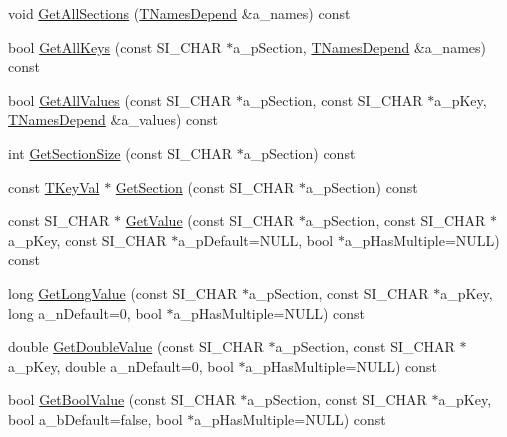 \begin{DoxyCompactItemize}
void \hyperlink{classCSimpleIniTempl_a65b01b5bf88d0dfe3ba51f12278cbcb8}{Get\+All\+Sections} (\hyperlink{classCSimpleIniTempl_a391b3f3751e06cd9e9de4fb16ac14342}{T\+Names\+Depend} \&a\+\_\+names) const 
\item 
bool \hyperlink{classCSimpleIniTempl_a8cf1357d78d28653b68790ab5d5b45f1}{Get\+All\+Keys} (const S\+I\+\_\+\+C\+H\+AR $\ast$a\+\_\+p\+Section, \hyperlink{classCSimpleIniTempl_a391b3f3751e06cd9e9de4fb16ac14342}{T\+Names\+Depend} \&a\+\_\+names) const 
\item 
bool \hyperlink{classCSimpleIniTempl_a263c85a8cd839c315fefc078e048257b}{Get\+All\+Values} (const S\+I\+\_\+\+C\+H\+AR $\ast$a\+\_\+p\+Section, const S\+I\+\_\+\+C\+H\+AR $\ast$a\+\_\+p\+Key, \hyperlink{classCSimpleIniTempl_a391b3f3751e06cd9e9de4fb16ac14342}{T\+Names\+Depend} \&a\+\_\+values) const 
\item 
int \hyperlink{classCSimpleIniTempl_a2e612d67d1e1631c157af6291ac8c348}{Get\+Section\+Size} (const S\+I\+\_\+\+C\+H\+AR $\ast$a\+\_\+p\+Section) const 
\item 
const \hyperlink{classCSimpleIniTempl_ae7f0e11d84617214bd479de6332c80e6}{T\+Key\+Val} $\ast$ \hyperlink{classCSimpleIniTempl_a795e2fcbad3472055aedfe188f4f8d33}{Get\+Section} (const S\+I\+\_\+\+C\+H\+AR $\ast$a\+\_\+p\+Section) const 
\item 
const S\+I\+\_\+\+C\+H\+AR $\ast$ \hyperlink{classCSimpleIniTempl_a39999339113e9395d5e2c6b02ef5c618}{Get\+Value} (const S\+I\+\_\+\+C\+H\+AR $\ast$a\+\_\+p\+Section, const S\+I\+\_\+\+C\+H\+AR $\ast$a\+\_\+p\+Key, const S\+I\+\_\+\+C\+H\+AR $\ast$a\+\_\+p\+Default=N\+U\+LL, bool $\ast$a\+\_\+p\+Has\+Multiple=N\+U\+LL) const 
\item 
long \hyperlink{classCSimpleIniTempl_a994c6b29bb8b4c16a4b1a7f4c8b2b3f4}{Get\+Long\+Value} (const S\+I\+\_\+\+C\+H\+AR $\ast$a\+\_\+p\+Section, const S\+I\+\_\+\+C\+H\+AR $\ast$a\+\_\+p\+Key, long a\+\_\+n\+Default=0, bool $\ast$a\+\_\+p\+Has\+Multiple=N\+U\+LL) const 
\item 
double \hyperlink{classCSimpleIniTempl_a6ce7c77a1d5d64dc289927a5c2659e78}{Get\+Double\+Value} (const S\+I\+\_\+\+C\+H\+AR $\ast$a\+\_\+p\+Section, const S\+I\+\_\+\+C\+H\+AR $\ast$a\+\_\+p\+Key, double a\+\_\+n\+Default=0, bool $\ast$a\+\_\+p\+Has\+Multiple=N\+U\+LL) const 
\item 
bool \hyperlink{classCSimpleIniTempl_af0a8cffb0b7f6ca04e3eed9ab4660666}{Get\+Bool\+Value} (const S\+I\+\_\+\+C\+H\+AR $\ast$a\+\_\+p\+Section, const S\+I\+\_\+\+C\+H\+AR $\ast$a\+\_\+p\+Key, bool a\+\_\+b\+Default=false, bool $\ast$a\+\_\+p\+Has\+Multiple=N\+U\+LL) const 

\end{DoxyCompactItemize}
